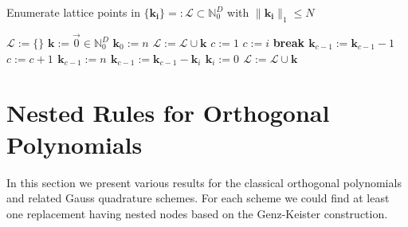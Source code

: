 \documentclass[a4paper,10pt]{article}
\begin{document}
\begin{algorithm}[h!]
  \caption{Enumerate lattice points in $\{\mathbf{k_{i}}\} =: \mathcal{L} \subset \mathbb{N}_{0}^{D}$
    with $\|\mathbf{k_{i}}\|_{1} \leq N$}
  \label{alg:ca_enumerate_lattice_points}
  \begin{algorithmic}
      \State $\mathcal{L} := \{\} $
        \State $\mathbf{k} := \vec{0} \in \mathbb{N}_{0}^{D}$
        \State $\mathbf{k}_{0} := n$
        \State $\mathcal{L} := \mathcal{L} \cup \mathbf{k}$
        \State $c := 1$
              \State $c := i$
                \State \bf{break}
              \EndIf
            \EndFor
            \State $\mathbf{k}_{c-1} := \mathbf{k}_{c-1} - 1$
            \State $c := c +1$
            \State $\mathbf{k}_{c-1} := n$
              \State $\mathbf{k}_{c-1} := \mathbf{k}_{c-1} - \mathbf{k}_{i}$
            \EndFor
                \State $\mathbf{k}_{i} := 0$
              \EndFor
            \EndIf
            \State $\mathcal{L} := \mathcal{L} \cup \mathbf{k}$
          \EndIf
        \EndWhile
      \EndFor
    \EndProcedure
  \end{algorithmic}
\end{algorithm}


\FloatBarrier
\section{Nested Rules for Orthogonal Polynomials}

In this section we present various results for the classical orthogonal polynomials
and related Gauss quadrature schemes. For each scheme we could find at least one
replacement having nested nodes based on the Genz-Keister construction.
\end{document}
